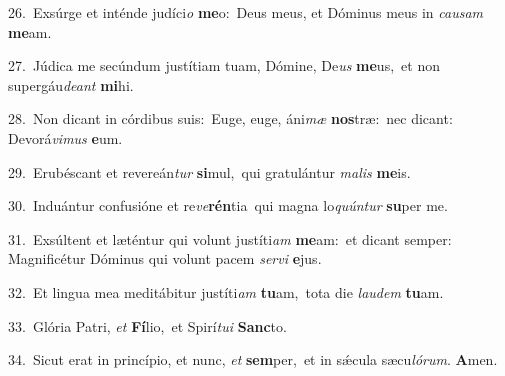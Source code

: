 {\numbfont\textcolor{\numbcolor}{26.}}~Exsúrge et inténde judíci\textit{o} \textbf{me}\-o:~\star Deus meus, et Dóminus meus in \textit{cau}\-\textit{sam} \textbf{me}\-am.\par
{\numbfont\textcolor{\numbcolor}{27.}}~Júdica me secúndum justítiam tuam, Dómine, De\textit{us} \textbf{me}\-us,~\star et non supergáu\-\textit{de}\-\textit{ant} \textbf{mi}\-hi.\par
{\numbfont\textcolor{\numbcolor}{28.}}~Non dicant in córdibus suis:~\dagger Euge, euge, áni\textit{mæ} \textbf{nos}\-træ:~\star nec dicant: Devorá\-\textit{vi}\-\textit{mus} \textbf{e}\-um.\par
{\numbfont\textcolor{\numbcolor}{29.}}~Erubéscant et revereán\textit{tur} \textbf{si}\-mul,~\star qui gratulántur \textit{ma}\-\textit{lis} \textbf{me}\-is.\par
{\numbfont\textcolor{\numbcolor}{30.}}~Induántur confusióne et re\-\textit{ve}\-\textbf{rén}tia~\star qui magna lo\-\textit{quún}\-\textit{tur} \textbf{su}\-per me.\par
{\numbfont\textcolor{\numbcolor}{31.}}~Exsúltent et læténtur qui volunt justíti\textit{am} \textbf{me}\-am:~\star et dicant semper: Magnificétur Dóminus qui volunt pacem \textit{ser}\-\textit{vi} \textbf{e}\-jus.\par
{\numbfont\textcolor{\numbcolor}{32.}}~Et lingua mea meditábitur justíti\textit{am} \textbf{tu}\-am,~\star tota die \textit{lau}\-\textit{dem} \textbf{tu}\-am.\par
{\numbfont\textcolor{\numbcolor}{33.}}~Glória Patri, \textit{et} \textbf{Fí}\-lio,~\star et Spirí\-\textit{tu}\-\textit{i} \textbf{Sanc}\-to.\par
{\numbfont\textcolor{\numbcolor}{34.}}~Sicut erat in princípio, et nunc, \textit{et} \textbf{sem}\-per,~\star et in sǽcula sæcu\-\textit{ló}\-\textit{rum}. \textbf{A}\-men.\par
